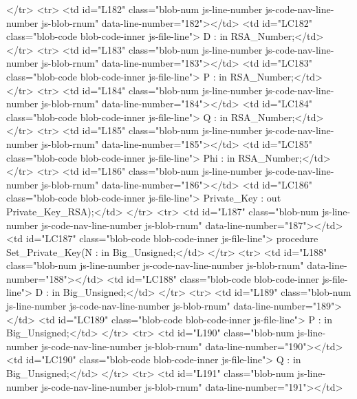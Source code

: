         </tr>
        <tr>
          <td id="L182" class="blob-num js-line-number js-code-nav-line-number js-blob-rnum" data-line-number="182"></td>
          <td id="LC182" class="blob-code blob-code-inner js-file-line">                            D           : in RSA_Number;</td>
        </tr>
        <tr>
          <td id="L183" class="blob-num js-line-number js-code-nav-line-number js-blob-rnum" data-line-number="183"></td>
          <td id="LC183" class="blob-code blob-code-inner js-file-line">                            P           : in RSA_Number;</td>
        </tr>
        <tr>
          <td id="L184" class="blob-num js-line-number js-code-nav-line-number js-blob-rnum" data-line-number="184"></td>
          <td id="LC184" class="blob-code blob-code-inner js-file-line">                            Q           : in RSA_Number;</td>
        </tr>
        <tr>
          <td id="L185" class="blob-num js-line-number js-code-nav-line-number js-blob-rnum" data-line-number="185"></td>
          <td id="LC185" class="blob-code blob-code-inner js-file-line">                            Phi         : in RSA_Number;</td>
        </tr>
        <tr>
          <td id="L186" class="blob-num js-line-number js-code-nav-line-number js-blob-rnum" data-line-number="186"></td>
          <td id="LC186" class="blob-code blob-code-inner js-file-line">                            Private_Key : out Private_Key_RSA);</td>
        </tr>
        <tr>
          <td id="L187" class="blob-num js-line-number js-code-nav-line-number js-blob-rnum" data-line-number="187"></td>
          <td id="LC187" class="blob-code blob-code-inner js-file-line">  procedure Set_Private_Key(N           : in Big_Unsigned;</td>
        </tr>
        <tr>
          <td id="L188" class="blob-num js-line-number js-code-nav-line-number js-blob-rnum" data-line-number="188"></td>
          <td id="LC188" class="blob-code blob-code-inner js-file-line">                            D           : in Big_Unsigned;</td>
        </tr>
        <tr>
          <td id="L189" class="blob-num js-line-number js-code-nav-line-number js-blob-rnum" data-line-number="189"></td>
          <td id="LC189" class="blob-code blob-code-inner js-file-line">                            P           : in Big_Unsigned;</td>
        </tr>
        <tr>
          <td id="L190" class="blob-num js-line-number js-code-nav-line-number js-blob-rnum" data-line-number="190"></td>
          <td id="LC190" class="blob-code blob-code-inner js-file-line">                            Q           : in Big_Unsigned;</td>
        </tr>
        <tr>
          <td id="L191" class="blob-num js-line-number js-code-nav-line-number js-blob-rnum" data-line-number="191"></td>
